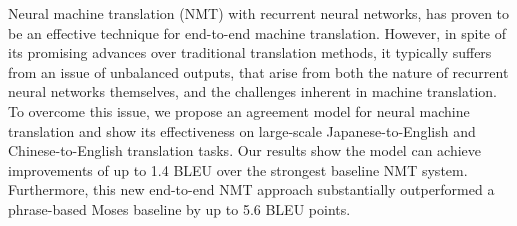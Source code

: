 Neural machine translation (NMT) with recurrent neural networks, has proven to be an effective technique for end-to-end machine translation. However, in spite of its promising advances over traditional translation methods, it typically suffers from an issue of unbalanced outputs, that arise from both the nature of recurrent neural networks themselves, and the challenges inherent in machine translation. To overcome this issue, we propose an agreement model for neural machine translation and show its effectiveness on large-scale Japanese-to-English and Chinese-to-English translation tasks. Our results show the model can achieve improvements of up to 1.4 BLEU over the strongest baseline NMT system. Furthermore, this new end-to-end NMT approach substantially outperformed a phrase-based Moses baseline by up to 5.6 BLEU points.
